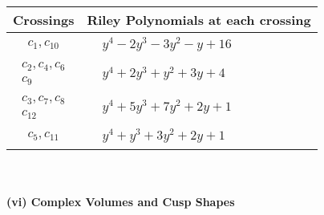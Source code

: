 \documentclass[1p]{elsarticle_modified}
\theoremstyle{definition}
\begin{document}
\begin{tabular}{m{50pt}|m{274pt}}
Crossings & \hspace{64pt}Riley Polynomials at each crossing \\
\hline $$\begin{aligned}c_{1},c_{10}\end{aligned}$$&$\begin{aligned}
&y^4-2 y^3-3 y^2- y+16
\end{aligned}$\\
\hline $$\begin{aligned}c_{2},c_{4},c_{6}\\c_{9}\end{aligned}$$&$\begin{aligned}
&y^4+2 y^3+y^2+3 y+4
\end{aligned}$\\
\hline $$\begin{aligned}c_{3},c_{7},c_{8}\\c_{12}\end{aligned}$$&$\begin{aligned}
&y^4+5 y^3+7 y^2+2 y+1
\end{aligned}$\\
\hline $$\begin{aligned}c_{5},c_{11}\end{aligned}$$&$\begin{aligned}
&y^4+y^3+3 y^2+2 y+1
\end{aligned}$\\
\hline
\end{tabular}\\~\\
\newpage\flushleft \textbf{(vi) Complex Volumes and Cusp Shapes}
\end{document}
